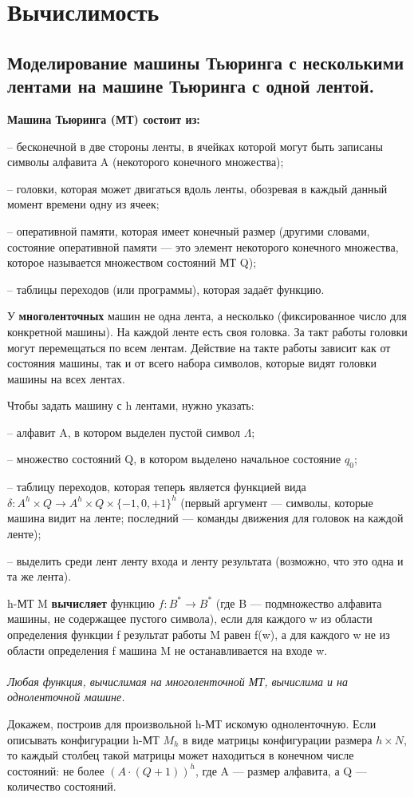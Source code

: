 \section{Вычислимость}

\subsection{Моделирование машины Тьюринга с несколькими лентами на машине Тьюринга с одной лентой.}
\textbf{Машина Тьюринга (МТ) состоит из:} \par
– бесконечной в две стороны ленты, в ячейках которой могут быть записаны символы
алфавита A (некоторого конечного множества);\par
– головки, которая может двигаться вдоль ленты, обозревая в каждый данный момент
времени одну из ячеек;\par
– оперативной памяти, которая имеет конечный размер (другими словами, состояние оперативной памяти — это элемент некоторого конечного множества, которое называется
множеством состояний МТ Q);\par
– таблицы переходов (или программы), которая задаёт функцию.

У \textbf{многоленточных} машин не одна лента, а несколько (фиксированное число для конкретной машины). На каждой ленте есть своя головка. За такт работы головки могут перемещаться по всем лентам. Действие на такте работы зависит как от состояния машины, так и от всего набора символов, которые видят головки машины на всех лентах.\par
Чтобы задать машину с h лентами, нужно указать:\par
– алфавит A, в котором выделен пустой символ $\Lambda$;\par
– множество состояний Q, в котором выделено начальное состояние $q_0$; \par
– таблицу переходов, которая теперь является функцией вида
$\delta : A^h \times Q \rightarrow A^h \times Q \times \{-1, 0, +1\}^h$
(первый аргумент — символы, которые машина видит на ленте; последний — команды
движения для головок на каждой ленте); \par
– выделить среди лент ленту входа и ленту результата (возможно, что это одна и та же
лента).

h-МТ M \textbf{вычисляет} функцию $f : B^* \rightarrow B^*$
(где B — подмножество алфавита машины, не содержащее пустого символа), если для каждого w из области определения функции f результат работы M равен f(w), а для каждого w не из области определения f машина M не останавливается на входе w. \\
\\
\emph{Любая функция, вычислимая на многоленточной МТ, вычислима и на одноленточной машине.} \par
Докажем, построив для произвольной h-МТ искомую одноленточную. Если описывать конфигурации h-МТ $M_h$ в виде матрицы конфигурации размера $h \times N$, то каждый столбец такой матрицы может находиться в конечном числе состояний: не более $(A \cdot (Q + 1))^h$, где A — размер алфавита, а Q — количество состояний.

